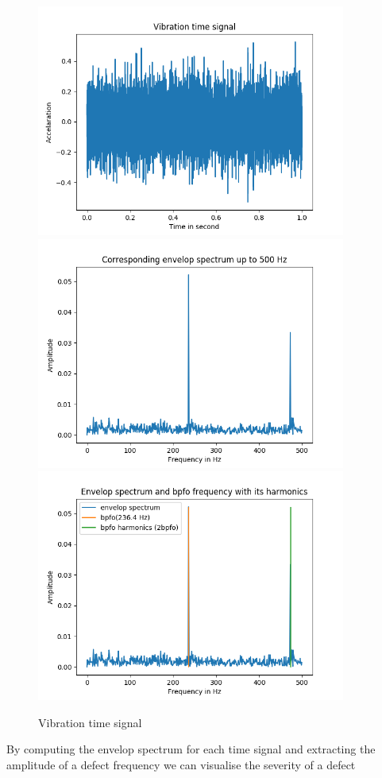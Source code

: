 \documentclass[11pt, oneside]{article}   	%
\begin{document}
\begin{figure}[H] %
   \centering
   \includegraphics[width=4in]{time-signal.png} 
   \includegraphics[width=4in]{spectrum.png} 
      \includegraphics[width=4in]{fault.png} 
   \caption{Vibration time signal}
   \label{fig:signal}
\end{figure}
By computing the envelop spectrum for each time signal and extracting the amplitude of a defect frequency we can visualise the severity of a defect
\end{document}
